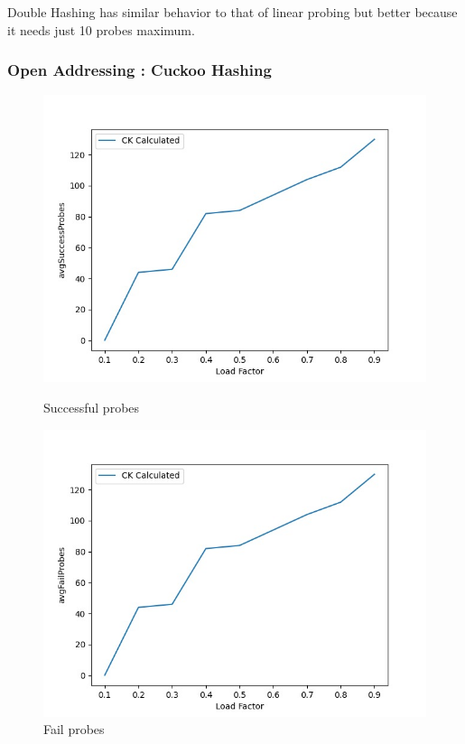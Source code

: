 \documentclass{article}
\begin{document}
      Double Hashing has similar behavior to that of linear probing but better because it needs just 10 probes maximum. 
    
    \subsubsection*{Open Addressing : Cuckoo Hashing}

        \begin{figure}[H]
          \includegraphics[width=\linewidth]{images/loadFactor_vs_avgSuccessProbes_CK.jpeg}
          \caption{Successful probes}\label{fig:plot10}
        \endminipage\hfill
          \includegraphics[width=\linewidth]{images/loadFactor_vs_avgFailProbes_CK.jpeg}
          \caption{Fail probes}\label{fig:plot11}
        \endminipage
    \end{figure}
    
\end{document}
